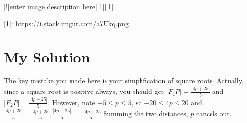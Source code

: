 \documentclass{article}
\begin{document}
[![enter image description here][1]][1]


  [1]: https://i.stack.imgur.com/a7Ukq.png
\section{My Solution}
The key mistake you made here is your simplification of square roots.
Actually, since a square root is positive always, you should get $\vert F_1P\vert = \frac{|4p+25|}{5} $ and $ \vert F_2P\vert = \frac{|4p-25|}{5}$.
However, note $ -5 \leq p \leq 5$, so $ -20 \leq 4p \leq 20$ and $\frac{|4p+25|}{5} = \frac{4p+25}{5}, \frac{|4p-25|}{5} = \frac{-4p+25}{5}$ Summing the two distances, $p$ cancels out.
\end{document}
